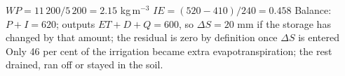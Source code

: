 \sol {}\ans $WP=11\,200/5\,200=2.15$ kg\,m$^{-3}$ \ans $IE=(520-410)/240=0.458$ \ans Balance: $P+I=620$; outputs $ET+D+Q=600$, so $\Delta S=20$ mm if the storage has changed by that amount; the residual is zero by definition once $\Delta S$ is entered \ans Only 46 per cent of the irrigation became extra evapotranspiration; the rest drained, ran off or stayed in the soil. \finans

